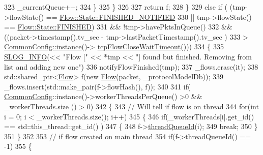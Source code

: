 \begin{DoxyCode}
323                         \_currentQueue++;
324                     \}
325                 \}
326 
327                 \textcolor{keywordflow}{return} f;
328             \}
329             \textcolor{keywordflow}{else} \textcolor{keywordflow}{if} ( (tmp->flowState() == \hyperlink{class_vsid_common_1_1_flow_a4c78d7517903031a861c7287e706a6c2a055b500bb0ed82a58f138a885208507a}{Flow::State::FINISHED\_NOTIFIED} 
330                                 || tmp->flowState() == \hyperlink{class_vsid_common_1_1_flow_a4c78d7517903031a861c7287e706a6c2a2c616b2713e2e0aed04b4c4752c88133}{Flow::State::FINISHED}) 
331                         && !tmp->havePktsInQueue()
332                         && ((packet->timestamp().tv\_sec - tmp->lastPacketTimestamp().tv\_sec ) 
333                                     > \hyperlink{class_vsid_common_1_1_common_config_a69c29458a786be527fe66470ac9fbbdb}{CommonConfig::instance}()->
      \hyperlink{class_vsid_common_1_1_common_config_a7005e5b9127c2c58525b81a10805e255}{tcpFlowCloseWaitTimeout}()))
334             \{
335                 \hyperlink{_logger_8h_a119c1c29ba35a8db38e2358e41167282}{SLOG\_INFO}(<< \textcolor{stringliteral}{"Flow ["} << *tmp << \textcolor{stringliteral}{"] found but finished. Removing from list and
       adding new one"})
336                 notifyFlowFinished(tmp);
337                 \_flows.erase(it);
338                 std::shared\_ptr<\hyperlink{class_vsid_common_1_1_flow}{Flow}>  f(new \hyperlink{class_vsid_common_1_1_flow}{Flow}(packet, \_protocolModelDb));
339                 \_flows.insert(std::make\_pair(f->flowHash(), f));
340 
341                 if( \hyperlink{class_vsid_common_1_1_common_config}{CommonConfig}::instance()->workerThreadsPerQueue() >0 && \_workerThreads.size
      () > 0)
342                 \{
343                     \textcolor{comment}{// Will tell if flow is on thread}
344                     \textcolor{keywordflow}{for}(\textcolor{keywordtype}{int} i = 0; i < \_workerThreads.size(); i++)
345                     \{
346                         \textcolor{keywordflow}{if}(\_workerThreads[i].get\_id() == std::this\_thread::get\_id() )
347                         \{
348                             f->\hyperlink{class_vsid_common_1_1_flow_a067c4a0fbf63c7295442c54898d9990d}{threadQueueId}(i);
349                             \textcolor{keywordflow}{break};
350                         \}
351                     \}
352 
353                     \textcolor{comment}{// if flow created on main thread}
354                     \textcolor{keywordflow}{if}(f->threadQueueId() == -1)
355                     \{

\end{DoxyCode}
